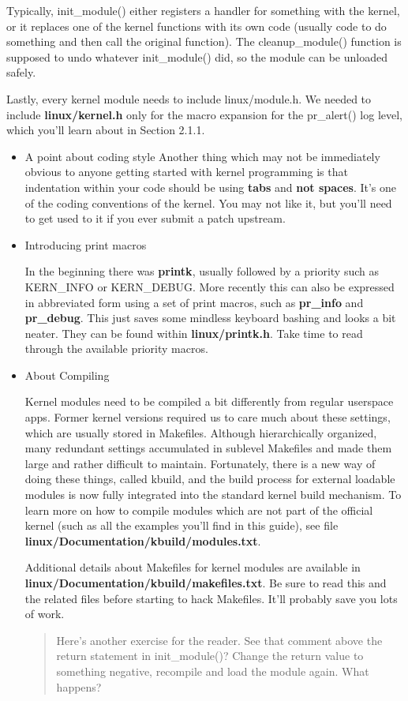 \documentclass[11pt]{article}
\begin{document}
Typically, init\_module() either registers a handler for something with the kernel, or it replaces one of the kernel functions with its own code (usually code to do something and then call the original function). The cleanup\_module() function is supposed to undo whatever init\_module() did, so the module can be unloaded safely.

Lastly, every kernel module needs to include linux/module.h. We needed to include \textbf{linux/kernel.h} only for the macro expansion for the pr\_alert() log level, which you'll learn about in Section 2.1.1.

\begin{itemize}
\item A point about coding style
\label{sec-4-1-0-1}
Another thing which may not be immediately obvious to anyone getting started with kernel programming is that indentation within your code should be using \textbf{tabs} and \textbf{not spaces}. It's one of the coding conventions of the kernel. You may not like it, but you'll need to get used to it if you ever submit a patch upstream.
\item Introducing print macros
\label{sec-4-1-0-2}

In the beginning there was \textbf{printk}, usually followed by a priority such as KERN\_INFO or KERN\_DEBUG. More recently this can also be expressed in abbreviated form using a set of print macros, such as \textbf{pr\_info} and \textbf{pr\_debug}. This just saves some mindless keyboard bashing and looks a bit neater. They can be found within \textbf{linux/printk.h}. Take time to read through the available priority macros.

\item About Compiling
\label{sec-4-1-0-3}

Kernel modules need to be compiled a bit differently from regular userspace apps. Former kernel versions required us to care much about these settings, which are usually stored in Makefiles. Although hierarchically organized, many redundant settings accumulated in sublevel Makefiles and made them large and rather difficult to maintain. Fortunately, there is a new way of doing these things, called kbuild, and the build process for external loadable modules is now fully integrated into the standard kernel build mechanism. To learn more on how to compile modules which are not part of the official kernel (such as all the examples you'll find in this guide), see file \textbf{linux/Documentation/kbuild/modules.txt}.

Additional details about Makefiles for kernel modules are available in \textbf{linux/Documentation/kbuild/makefiles.txt}. Be sure to read this and the related files before starting to hack Makefiles. It'll probably save you lots of work.

\begin{quote}
Here's another exercise for the reader. See that comment above the return statement in init\_module()? Change the return value to something negative, recompile and load the module again. What happens?
\end{quote}
\end{itemize}
\end{document}
